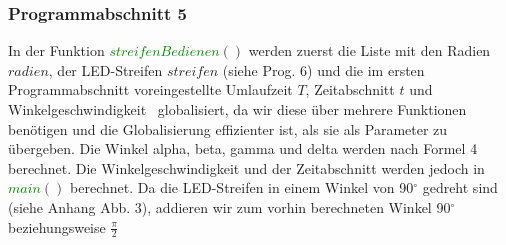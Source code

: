 \documentclass [a4paper, 11pt] {article}
\begin{document}
\subsubsection{Programmabschnitt 5}
In der Funktion \textcolor{green}{$streifenBedienen$}{$()$} werden zuerst die Liste mit den Radien {$radien$}, der LED-Streifen {$streifen$} (siehe Prog. 6) und die im ersten Programmabschnitt voreingestellte Umlaufzeit {$T$}, Zeitabschnitt {$t$} und Winkelgeschwindigkeit \textomega\ globalisiert, da wir diese über mehrere Funktionen benötigen und die Globalisierung effizienter ist, als sie als Parameter zu übergeben. Die Winkel alpha, beta, gamma und delta werden nach Formel 4 berechnet. Die Winkelgeschwindigkeit und der Zeitabschnitt werden jedoch in \textcolor{green}{$main$}{$()$} berechnet. Da die LED-Streifen in einem Winkel von 90$^\circ$ gedreht sind (siehe Anhang Abb. 3), addieren wir zum vorhin berechneten Winkel 90$^\circ$ beziehungsweise
$\frac{\pi}{2}$
\end{document}

